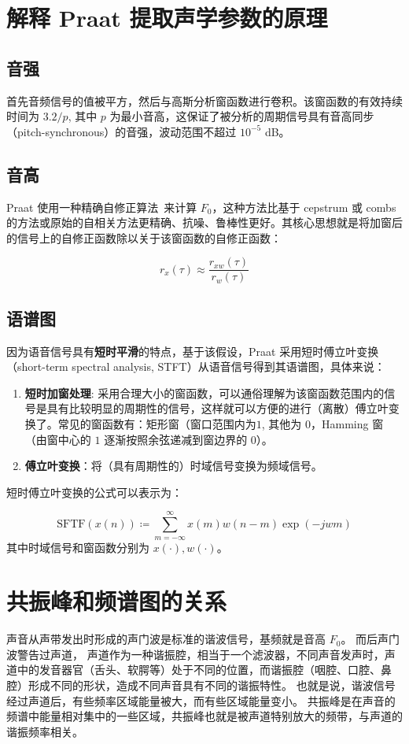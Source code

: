 \section{解释 Praat 提取声学参数的原理}
\subsection{音强}
首先音频信号的值被平方，然后与高斯分析窗函数进行卷积。该窗函数的有效持续时间为 $3.2 / p$, 其中 $p$ 为最小音高，这保证了被分析的周期信号具有音高同步（pitch-synchronous）的音强，波动范围不超过 $10^{-5}$ dB。

\subsection{音高}
Praat 使用一种精确自修正算法~\cite{pitch_algo}来计算 $F_0$，这种方法比基于 cepstrum 或 combs 的方法或原始的自相关方法更精确、抗噪、鲁棒性更好。其核心思想就是将加窗后的信号上的自修正函数除以关于该窗函数的自修正函数：

\begin{equation}
  r_x(\tau) \approx \frac{r_{xw}(\tau)}{r_w(\tau)}
\end{equation}

\subsection{语谱图}
因为语音信号具有\textbf{短时平滑}的特点，基于该假设，Praat 采用短时傅立叶变换（short-term spectral analysis, STFT）从语音信号得到其语谱图，具体来说：

\begin{enumerate}
  \item \textbf{短时加窗处理}: 采用合理大小的窗函数，可以通俗理解为该窗函数范围内的信号是具有比较明显的周期性的信号，这样就可以方便的进行（离散）傅立叶变换了。常见的窗函数有：矩形窗（窗口范围内为$1$, 其他为 $0$，Hamming 窗（由窗中心的 $1$ 逐渐按照余弦递减到窗边界的 $0$）。
  \item \textbf{傅立叶变换}：将（具有周期性的）时域信号变换为频域信号。
\end{enumerate}

短时傅立叶变换的公式可以表示为：

\begin{equation}
  \text{SFTF}(x(n)) \coloneqq \sum_{m=-\infty}^{\infty} x(m) w(n-m) \exp(-jwm)
\end{equation}
其中时域信号和窗函数分别为 $x(\cdot), w(\cdot)$。

\section{共振峰和频谱图的关系}
声音从声带发出时形成的声门波是标准的谐波信号，基频就是音高 $F_0$。
而后声门波警告过声道， 声道作为一种谐振腔，相当于一个滤波器，不同声音发声时，声道中的发音器官（舌头、软腭等）处于不同的位置，而谐振腔（咽腔、口腔、鼻腔）形成不同的形状，造成不同声音具有不同的谐振特性。
也就是说，谐波信号经过声道后，有些频率区域能量被大，而有些区域能量变小。
共振峰是在声音的频谱中能量相对集中的一些区域，共振峰也就是被声道特别放大的频带，与声道的谐振频率相关。

